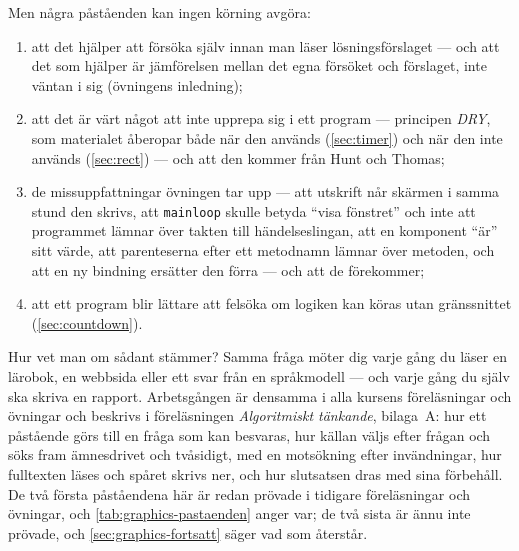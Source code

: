 Men några påståenden kan ingen körning avgöra:
\begin{enumerate}
  \item att det hjälper att försöka själv innan man läser
    lösningsförslaget --- och att det som hjälper är jämförelsen mellan
    det egna försöket och förslaget, inte väntan i sig (övningens
    inledning);
  \item att det är värt något att inte upprepa sig i ett program ---
    principen \emph{DRY}, som materialet åberopar både när den används
    (\cref{sec:timer}) och när den inte används
    (\cref{sec:rect}) --- och att den kommer från Hunt och Thomas;
  \item de missuppfattningar övningen tar upp --- att utskrift
    når skärmen i samma stund den skrivs, att
    \texttt{mainloop} skulle betyda \enquote{visa fönstret}
    och inte att programmet lämnar över takten till händelseslingan,
    att en komponent \enquote{är} sitt värde, att parenteserna efter ett
    metodnamn lämnar över metoden, och att en ny bindning ersätter den
    förra --- och att de förekommer;
  \item att ett program blir lättare att felsöka om logiken kan köras
    utan gränssnittet (\cref{sec:countdown}).
\end{enumerate}
Hur vet man om sådant stämmer?  Samma fråga möter dig varje gång du läser
en lärobok, en webbsida eller ett svar från en språkmodell --- och varje
gång du själv ska skriva en rapport.  Arbetsgången är densamma i alla
kursens föreläsningar och övningar och beskrivs i föreläsningen
\emph{Algoritmiskt tänkande}, bilaga~A: hur ett påstående görs till en
fråga som kan besvaras, hur källan väljs efter frågan och söks fram
ämnesdrivet och tvåsidigt, med en motsökning efter invändningar, hur
fulltexten läses och spåret skrivs ner, och hur slutsatsen dras med sina
förbehåll.  De två första påståendena här är redan prövade i tidigare
föreläsningar och övningar, och \cref{tab:graphics-pastaenden} anger
var; de två sista är ännu inte prövade, och
\cref{sec:graphics-fortsatt} säger vad som återstår.


